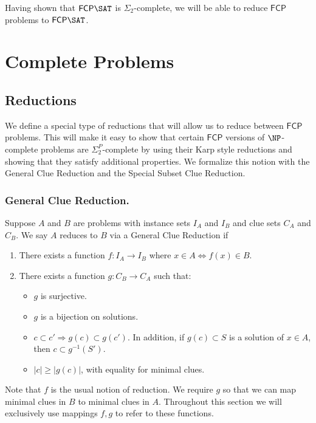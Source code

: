 \documentclass[runningheads,a4paper]{llncs}
\begin{document}
Having shown that $\mathsf{FCP} \SAT$ is $\Sigma_2$-complete, we will be able to reduce $\mathsf{FCP}$ problems to $\mathsf{FCP} \SAT$.

\section{Complete Problems}
\label{sec:The Problems}

\subsection{Reductions}

We define a special type of reductions that will allow us to reduce between $\mathsf{FCP}$ problems. This will make it easy to show that certain $\mathsf{FCP}$ versions of $\NP$-complete problems are $\Sigma_2^P$-complete by using their Karp style reductions and showing that they satisfy additional properties. We formalize this notion with the General Clue Reduction and the Special Subset Clue Reduction. 

\subsubsection{General Clue Reduction.}

\begin{definition}\label{def:GCR}
Suppose $A$ and $B$ are problems with instance sets $I_A$ and $I_B$ and clue sets $C_A$ and $C_B$. We say $A$ reduces to $B$ via a General Clue Reduction if
\begin{enumerate}
\item There exists a function $f: I_A \rightarrow I_B$ where $x \in A \iff f(x) \in B$.
\item There exists a function $g: C_B \rightarrow C_A$ such that:
\begin{itemize}
\item $g$ is surjective. 
\item $g$ is a bijection on solutions.
\item $c \subset c' \Rightarrow g(c) \subset g(c')$. In addition, if $g(c) \subset S$ is a solution of $x \in A$, then $c \subset g^{-1}(S')$.
\item $|c| \geq |g(c)|$, with equality for minimal clues. 
\end{itemize}
\end{enumerate}
\end{definition}
Note that $f$ is the usual notion of reduction. We require $g$ so that we can map minimal clues in $B$ to minimal clues in $A$. Throughout this section we will exclusively use mappings $f, g$ to refer to these functions. 
\end{document}
